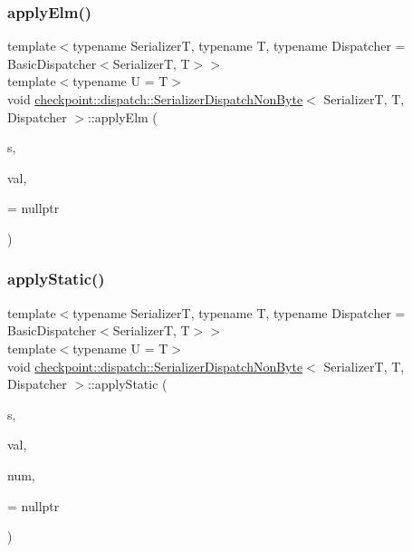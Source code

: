 \subsubsection{\texorpdfstring{apply\+Elm()}{applyElm()}\hspace{0.1cm}{\footnotesize\ttfamily [3/3]}}
{\footnotesize\ttfamily template$<$typename SerializerT, typename T, typename Dispatcher = Basic\+Dispatcher$<$\+Serializer\+T, T$>$$>$ \\
template$<$typename U  = T$>$ \\
void \hyperlink{structcheckpoint_1_1dispatch_1_1_serializer_dispatch_non_byte}{checkpoint\+::dispatch\+::\+Serializer\+Dispatch\+Non\+Byte}$<$ SerializerT, T, Dispatcher $>$\+::apply\+Elm (\begin{DoxyParamCaption}\item[{SerializerT \&}]{s,  }\item[{T $\ast$}]{val,  }\item[{\hyperlink{structcheckpoint_1_1dispatch_1_1_serializer_dispatch_non_byte_ac47ded9971a3ed3d8d1824d1ff12031a}{is\+Enum}$<$ U $>$ $\ast$}]{ = {\ttfamily nullptr} }\end{DoxyParamCaption})\hspace{0.3cm}{\ttfamily [inline]}}

\mbox{\label{structcheckpoint_1_1dispatch_1_1_serializer_dispatch_non_byte_a38d952156a857c4eba994db912725590}} 
\subsubsection{\texorpdfstring{apply\+Static()}{applyStatic()}\hspace{0.1cm}{\footnotesize\ttfamily [1/4]}}
{\footnotesize\ttfamily template$<$typename SerializerT, typename T, typename Dispatcher = Basic\+Dispatcher$<$\+Serializer\+T, T$>$$>$ \\
template$<$typename U  = T$>$ \\
void \hyperlink{structcheckpoint_1_1dispatch_1_1_serializer_dispatch_non_byte}{checkpoint\+::dispatch\+::\+Serializer\+Dispatch\+Non\+Byte}$<$ SerializerT, T, Dispatcher $>$\+::apply\+Static (\begin{DoxyParamCaption}\item[{SerializerT \&}]{s,  }\item[{T $\ast$}]{val,  }\item[{\hyperlink{namespacecheckpoint_a083f6674da3f94c2901b18c6d238217c}{Serial\+Size\+Type}}]{num,  }\item[{\hyperlink{structcheckpoint_1_1dispatch_1_1_serializer_dispatch_non_byte_a162005f14e0a0cf2f3df64c2d9ec4d9e}{just\+Footprint}$<$ U $>$ $\ast$}]{ = {\ttfamily nullptr} }\end{DoxyParamCaption})\hspace{0.3cm}{\ttfamily [inline]}}



